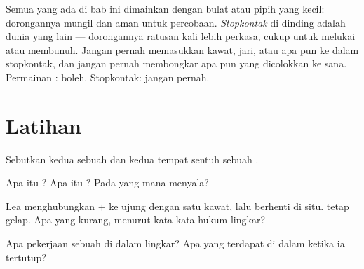 \begin{remark}\label{rem:g3:first-electric-circuit:safety}
Semua yang ada di bab ini dimainkan dengan  bulat atau pipih
yang kecil: dorongannya mungil dan aman untuk percobaan.
\emph{Stopkontak} di dinding adalah dunia yang lain --- dorongannya
ratusan kali lebih perkasa, cukup untuk melukai atau membunuh. Jangan
pernah memasukkan kawat, jari, atau apa pun ke dalam stopkontak, dan
jangan pernah membongkar apa pun yang dicolokkan ke sana. Permainan
: boleh. Stopkontak: jangan pernah.
\end{remark}

\section{Latihan}

\begin{exercise}[$\star$]\label{exo:g3:first-electric-circuit:1}
Sebutkan kedua  sebuah  dan kedua tempat sentuh sebuah
.
\end{exercise}

\begin{exercise}[$\star$]\label{exo:g3:first-electric-circuit:2}
Apa itu ? Apa itu ? Pada yang mana
 menyala?
\end{exercise}

\begin{exercise}[$\star$]\label{exo:g3:first-electric-circuit:3}
Lea menghubungkan  $+$  ke ujung  dengan satu kawat,
lalu berhenti di situ.  tetap gelap. Apa yang kurang, menurut
kata-kata hukum lingkar?
\end{exercise}

\begin{exercise}[$\star$]\label{exo:g3:first-electric-circuit:4}
Apa pekerjaan sebuah  di dalam lingkar? Apa yang terdapat di
dalam  ketika ia tertutup?
\end{exercise}

